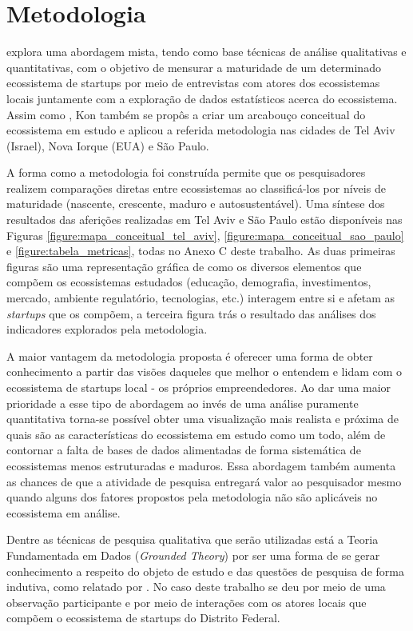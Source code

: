 \chapter{Metodologia}
\label{cap-metodologia}

 explora uma abordagem mista, tendo como base técnicas de análise qualitativas e quantitativas, com o objetivo de mensurar a maturidade de um determinado ecossistema de startups por meio de entrevistas com atores dos ecossistemas locais juntamente com a exploração de dados estatísticos acerca do ecossistema. Assim como , Kon também se propôs a criar um arcabouço conceitual do ecossistema em estudo e aplicou a referida metodologia nas cidades de Tel Aviv (Israel), Nova Iorque (EUA) e São Paulo.

A forma como a metodologia foi construída permite que os pesquisadores realizem comparações diretas entre ecossistemas ao classificá-los por níveis de maturidade (nascente, crescente, maduro e autosustentável). Uma síntese dos resultados das aferições realizadas em Tel Aviv e São Paulo estão disponíveis nas Figuras \ref{figure:mapa_conceitual_tel_aviv}, \ref{figure:mapa_conceitual_sao_paulo} e \ref{figure:tabela_metricas}, todas no Anexo C deste trabalho. As duas primeiras figuras são uma representação gráfica de como os diversos elementos que compõem os ecossistemas estudados (educação, demografia, investimentos, mercado, ambiente regulatório, tecnologias, etc.) interagem entre si e afetam as \textit{startups} que os compõem, a terceira figura trás o resultado das análises dos indicadores explorados pela metodologia.

A maior vantagem da metodologia proposta é oferecer uma forma de obter conhecimento a partir das visões daqueles que melhor o entendem e lidam com o ecossistema de startups local - os próprios empreendedores. Ao dar uma maior prioridade a esse tipo de abordagem ao invés de uma análise puramente quantitativa torna-se possível obter uma visualização mais realista e próxima de quais são as características do ecossistema em estudo como um todo, além de contornar a falta de bases de dados alimentadas de forma sistemática de ecossistemas menos estruturadas e maduros. Essa abordagem também aumenta as chances de que a atividade de pesquisa entregará valor ao pesquisador mesmo quando alguns dos fatores propostos pela metodologia não são aplicáveis no ecossistema em análise.

Dentre as técnicas de pesquisa qualitativa que serão utilizadas está a Teoria Fundamentada em Dados (\textit{Grounded Theory}) por ser uma forma de se gerar conhecimento a respeito do objeto de estudo e das questões de pesquisa de forma indutiva, como relatado por . No caso deste trabalho se deu por meio de uma observação participante e por meio de interações com os atores locais que compõem o ecossistema de startups do Distrito Federal.

